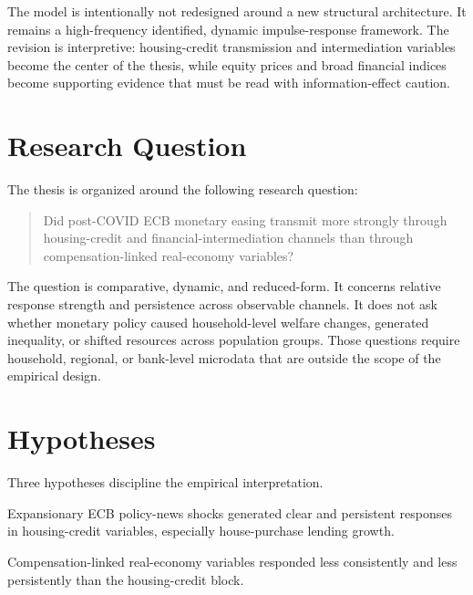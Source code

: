 \noindent The model is intentionally not redesigned around a new structural architecture. It remains a high-frequency identified, dynamic impulse-response framework. The revision is interpretive: housing-credit transmission and intermediation variables become the center of the thesis, while equity prices and broad financial indices become supporting evidence that must be read with information-effect caution.

\section{Research Question}

The thesis is organized around the following research question:

\begin{quote}
Did post-COVID ECB monetary easing transmit more strongly through housing-credit and financial-intermediation channels than through compensation-linked real-economy variables?
\end{quote}

The question is comparative, dynamic, and reduced-form. It concerns relative response strength and persistence across observable channels. It does not ask whether monetary policy caused household-level welfare changes, generated inequality, or shifted resources across population groups. Those questions require household, regional, or bank-level microdata that are outside the scope of the empirical design.

\section{Hypotheses}

Three hypotheses discipline the empirical interpretation.

\begin{hypothesis}
\label{hyp:housing-credit-persistence}
Expansionary ECB policy-news shocks generated clear and persistent responses in housing-credit variables, especially house-purchase lending growth.
\end{hypothesis}

\begin{hypothesis}
\label{hyp:compensation-linked-attenuation}
Compensation-linked real-economy variables responded less consistently and less persistently than the housing-credit block.
\end{hypothesis}

